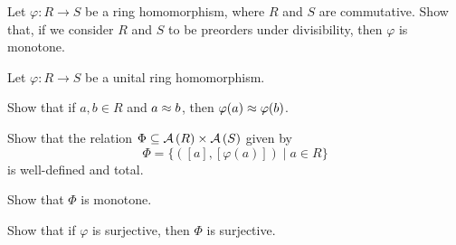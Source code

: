 \begin{exercise}
Let \(\varphi : R \rightarrow S\) be a ring homomorphism, where \(R\) and \(S\) are commutative.
Show that, if we consider \(R\) and \(S\) to be preorders under divisibility, then \(\varphi\) is monotone.
\end{exercise}


\begin{exercise}
Let \(\varphi : R \rightarrow S\) be a unital ring homomorphism.
\begin{proplist}
\item Show that if \(a,b \in R\) and \(a \approx b\), then \(\varphi(a) \approx \varphi(b)\).
\item Show that the relation \( \Phi \subseteq  \mathcal{A}\left(R\right)  \times  \mathcal{A}\left(S\right)  \) given by \[ \Phi = \{ ([a],[\varphi(a)]) \mid a \in R \} \] is well-defined and total.
\item Show that \(\Phi\) is monotone.
\item Show that if \(\varphi\) is surjective, then \(\Phi\) is surjective.
\end{proplist}
\end{exercise}

